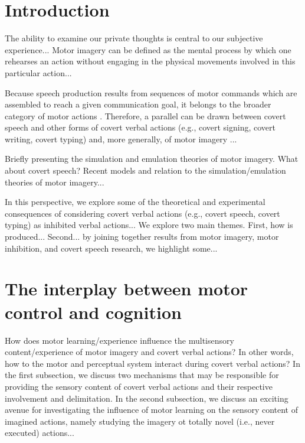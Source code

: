 \documentclass[utf8]{template/frontiersSCNS} %
\begin{document}
\newpage

\section{Introduction}


The ability to examine our private thoughts is central to our subjective experience... Motor imagery can be defined as the mental process by which one rehearses an action without engaging in the physical movements involved in this particular action...

Because speech production results from sequences of motor commands which are assembled to reach a given communication goal, it belongs to the broader category of motor actions \citep{jeannerod_motor_2006}. Therefore, a parallel can be drawn between covert speech and other forms of covert verbal actions (e.g., covert signing, covert writing, covert typing) and, more generally, of motor imagery \citep{alderson-day_inner_2015, perrone-bertolotti_what_2014, loevenbruck_cognitive_2018}...

Briefly presenting the simulation and emulation theories of motor imagery. What about covert speech? Recent models and relation to the simulation/emulation theories of motor imagery...

In this perspective, we explore some of the theoretical and experimental consequences of considering covert verbal actions (e.g., covert speech, covert typing) as inhibited verbal actions... We explore two main themes. First, how is produced... Second... by joining together results from motor imagery, motor inhibition, and covert speech research, we highlight some...

\section{The interplay between motor control and cognition}

How does motor learning/experience influence the multisensory content/experience of motor imagery and covert verbal actions? In other words, how to the motor and perceptual system interact during covert verbal actions? In the first subsection, we discuss two mechanisms that may be responsible for providing the sensory content of covert verbal actions and their respective involvement and delimitation. In the second subsection, we discuss an exciting avenue for investigating the influence of motor learning on the sensory content of imagined actions, namely studying the imagery ot totally novel (i.e., never executed) actions...
\end{document}
